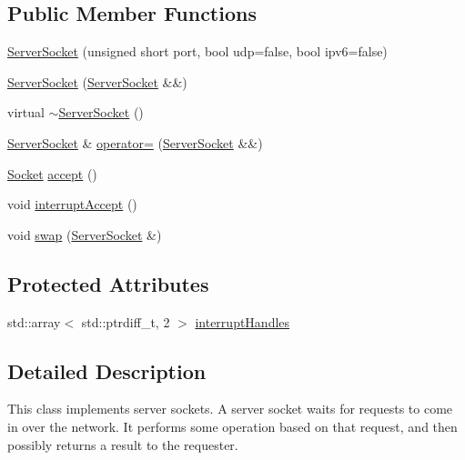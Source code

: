 \subsection*{Public Member Functions}
\begin{DoxyCompactItemize}
\item 
\hyperlink{classlog4cplus_1_1helpers_1_1ServerSocket_aecd376d55b5718cbabc7d742ce177dd3}{Server\-Socket} (unsigned short port, bool udp=false, bool ipv6=false)
\item 
\hyperlink{classlog4cplus_1_1helpers_1_1ServerSocket_a81ad6276f702e6b5218edbac13618f76}{Server\-Socket} (\hyperlink{classlog4cplus_1_1helpers_1_1ServerSocket}{Server\-Socket} \&\&)
\item 
virtual \hyperlink{classlog4cplus_1_1helpers_1_1ServerSocket_ae3df567d76a5d0d033564454c3bb5547}{$\sim$\-Server\-Socket} ()
\item 
\hyperlink{classlog4cplus_1_1helpers_1_1ServerSocket}{Server\-Socket} \& \hyperlink{classlog4cplus_1_1helpers_1_1ServerSocket_aaa6a2fde6834477a0aed56d12fd59ca6}{operator=} (\hyperlink{classlog4cplus_1_1helpers_1_1ServerSocket}{Server\-Socket} \&\&)
\item 
\hyperlink{classlog4cplus_1_1helpers_1_1Socket}{Socket} \hyperlink{classlog4cplus_1_1helpers_1_1ServerSocket_aaf488d8cdcd952d8c07c9f071693ec74}{accept} ()
\item 
void \hyperlink{classlog4cplus_1_1helpers_1_1ServerSocket_a791950b2dc48df1b88ea22f4dbd6429b}{interrupt\-Accept} ()
\item 
void \hyperlink{classlog4cplus_1_1helpers_1_1ServerSocket_aa5f35617f42d2cc781d7235dbfbdc89f}{swap} (\hyperlink{classlog4cplus_1_1helpers_1_1ServerSocket}{Server\-Socket} \&)
\end{DoxyCompactItemize}
\subsection*{Protected Attributes}
\begin{DoxyCompactItemize}
\item 
std\-::array$<$ std\-::ptrdiff\-\_\-t, 2 $>$ \hyperlink{classlog4cplus_1_1helpers_1_1ServerSocket_a09663d1b95e7c87e88c9d19db9abe59b}{interrupt\-Handles}
\end{DoxyCompactItemize}


\subsection{Detailed Description}
This class implements server sockets. A server socket waits for requests to come in over the network. It performs some operation based on that request, and then possibly returns a result to the requester. 

